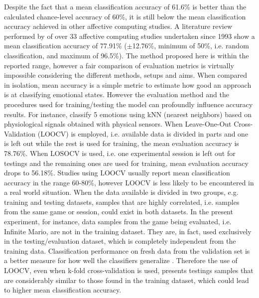 Despite the fact that a mean classification accuracy of 61.6\% is better than the calculated chance-level accuracy of 60\%, it is still below the mean classification accuracy achieved in other affective computing studies. A literature review performed by \textcite{moghimi2017affective} of over 33 affective computing studies undertaken since 1993 show a mean classification accuracy of 77.91\% ($\pm$12.76\%, minimum of 50\%, i.e. random classification, and maximum of 96.5\%). The method proposed here is within the reported range, however a fair comparison of evaluation metrics is virtually impossible considering the different methods, setups and aims. When compared in isolation, mean accuracy is a simple metric to estimate how good an approach is at classifying emotional states. However the evaluation method and the procedures used for training/testing the model can profoundly influence accuracy results. For instance, \textcite{kukolja2014comparative} classify 5 emotions using kNN (nearest neighbors) based on physiological signals obtained with physical sensors. When Leave-One-Out Cross-Validation (LOOCV) is employed, i.e. available data is divided in parts and one is left out while the rest is used for training, the mean evaluation accuracy is 78.76\%. When LOSOCV is used, i.e. one experimental session is left out for testings and the remaining ones are used for training, mean evaluation accuracy drops to 56.18\%. Studies using LOOCV usually report mean classification accuracy in the range 60-80\%, however LOOCV is less likely to be encountered in a real world situation. When the data available is divided in two groups, e.g. training and testing datasets, samples that are highly correlated, i.e. samples from the same game or session, could exist in both datasets. In the present experiment, for instance, data samples from the game being evaluated, i.e. Infinite Mario, are not in the training dataset. They are, in fact, used exclusively in the testing/evaluation dataset, which is completely independent from the training data. Classification performance on fresh data from the validation set is a better measure for how well the classifiers generalize \parencite[Chapter 5]{james2013introduction}. Therefore the use of LOOCV, even when k-fold cross-validation is used, presents testings samples that are considerably similar to those found in the training dataset, which could lead to higher mean classification accuracy.

